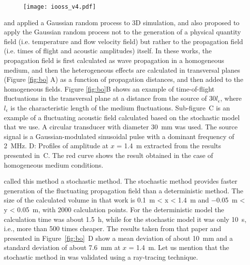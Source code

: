     \begin{figure}[htbp]
        \centerline{\texttt{[image: iooss\_v4.pdf]}}
        \label{fig:iooss}
    \end{figure}

    \cite{Lue2011Modelisationdela} and \textcite{Lue2012Stochasticsimulationof} applied a Gaussian random process to 3D simulation, and also proposed to apply
the Gaussian random process not to the generation of a physical quantity field (i.e. temperature and flow velocity field) but rather to the propagation field
(i.e. times of flight and acoustic amplitudes) itself. In these works, the propagation field is first calculated as wave propagation in a homogeneous medium,
and then the heterogeneous effects are calculated in transversal planes (Figure \ref{fig:bo} A) as a function of propagation distances, and then added to
the homogeneous fields.
Figure \ref{fig:bo}B shows an example of time-of-flight fluctuations in the transversal plane at a distance from the source of $30 l_\epsilon$,
where $l_\epsilon$ is the characteristic length of the medium fluctuations.
Sub-figure~C is an example of a fluctuating acoustic field calculated based on the stochastic model that we use.
A circular transducer with diameter \SI{30}{\milli\meter} was used.
The source signal is a Gaussian-modulated sinusoidal pulse with a dominant frequency of \SI{2}{\mega\hertz}.
D: Profiles of amplitude at $x$ = \SI{1.4}{\meter} extracted from the results presented in~C.
The red curve shows the result obtained in the case of homogeneous medium conditions.

\textcite{Lue2012Stochasticsimulationof} called this method a stochastic method.
The stochastic method provides faster generation of the fluctuating propagation field than a deterministic method.
The size of the calculated volume in that work is \SI{0.1}{\meter} < x < \SI{1.4}{\meter} and \SI{-0.05}{\meter} < y < \SI{0.05}{\meter}, with 2000 calculation points.
For the deterministic model the calculation time was about \SI{1.5}{\hour}, while for the stochastic model it was only \SI{10}{\second}, i.e., more than 500 times cheaper.
The results taken from that paper and presented in Figure~\ref{fig:bo}~D show a mean deviation of about \SI{10}{\milli\meter}
and a standard deviation of about \SI{7.6}{\milli\meter} at $x$ = \SI{1.4}{\meter}.
Let us mention that the stochastic method in \textcite{Lue2012Stochasticsimulationof} was validated using a ray-tracing technique.

